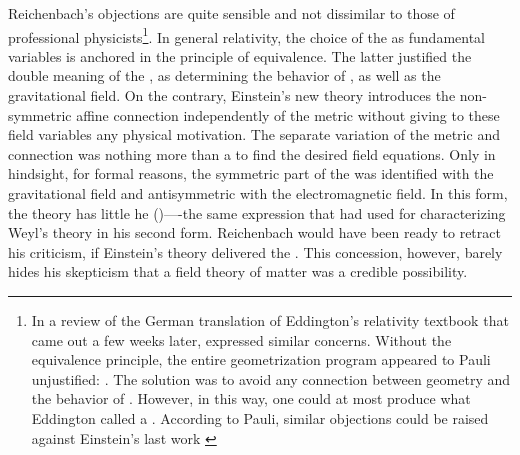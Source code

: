 \documentclass[final]{article}
\newcommand{\WT}{Weyl's theory\xspace}
\begin{document}
Reichenbach's objections are quite sensible and not dissimilar to those of professional physicists\footnote{In a review of the German translation \citep{Eddington1925} of Eddington's relativity textbook \citep{Eddington1923} that came out a few weeks later, \citet{Pauli1926} expressed similar concerns. Without the equivalence principle, the entire geometrization program appeared to Pauli unjustified:  \citep{Pauli1926}. The solution was to avoid any connection between geometry and the behavior of \rac. However, in this way, one could at most produce what Eddington called a . According to Pauli, similar objections could be raised against Einstein's last work \citep{Einstein1925}}. In general relativity, the choice of the \gmn as fundamental variables is anchored in the principle of equivalence. The latter justified the double meaning of the \gmn, as determining the behavior of \rac, as well as the gravitational field. On the contrary, Einstein's new theory introduces the non-symmetric affine connection \Gtmn independently of the metric \gmn without giving to these field variables any physical motivation. The separate variation of the metric and connection was nothing more than a  to find the desired field equations. Only in hindsight, for formal reasons, the symmetric part of the \gmn was identified with the gravitational field and antisymmetric with the electromagnetic field. In this form, the theory has little he  ()----the same expression that \citet[367]{Reichenbach1921} had used for characterizing \WT in his second form. Reichenbach would have been ready to retract his criticism, if Einstein's theory delivered the . This concession, however, barely hides his skepticism that a field theory of matter was a credible possibility.
\end{document}
